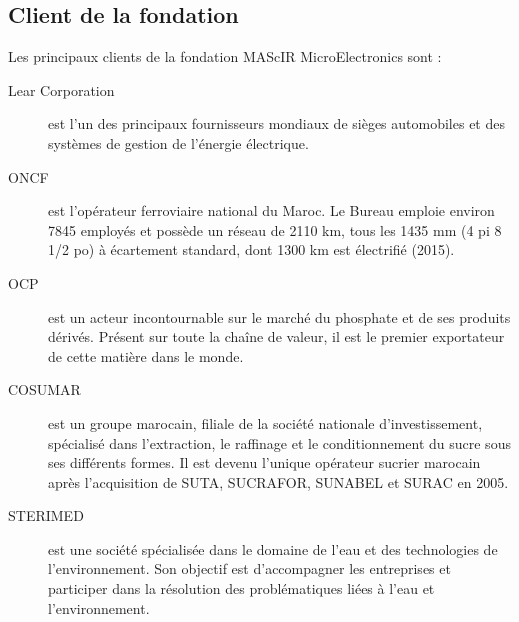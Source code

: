 \documentclass[11pt, a4paper, twoside]{book}
\begin{document}
\subsection{Client de la fondation}
Les principaux clients de la fondation MAScIR MicroElectronics sont :
\begin{description}
\item[Lear Corporation] est l’un des principaux fournisseurs mondiaux de sièges automobiles et des systèmes de gestion de l’énergie électrique.
\item[ONCF] est l'opérateur ferroviaire national du Maroc. Le Bureau emploie environ 7845 employés et possède un réseau de 2110 km, tous les 1435 mm (4 pi 8 1/2 po) à écartement standard, dont 1300 km est électrifié (2015).
\item[OCP] est un acteur incontournable sur le marché du phosphate et de ses produits dérivés. Présent sur toute la chaîne de valeur, il est le premier exportateur de cette matière dans le monde.
\item[COSUMAR] est un groupe marocain, filiale de la société nationale d'investissement, spécialisé dans l'extraction, le raffinage et le conditionnement du sucre sous ses différents formes. Il est devenu l'unique opérateur sucrier marocain après l'acquisition de SUTA, SUCRAFOR, SUNABEL et SURAC en 2005.
\item[STERIMED] est une société spécialisée dans le domaine de l’eau et des technologies de l’environnement. Son objectif est d’accompagner les entreprises et participer dans la résolution des problématiques liées à l’eau et l’environnement.
\end{description}
\end{document}
